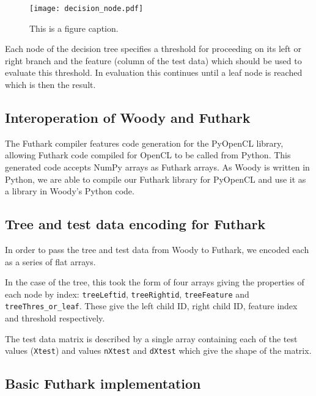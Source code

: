 \documentclass[a4paper]{article}
\begin{document}
\begin{figure}
\centering
\texttt{[image: decision\_node.pdf]}
\caption{\label{fig:frog1}This is a figure caption.}
\end{figure}

Each node of the decision tree specifies a threshold for proceeding on its left or right branch and the feature (column of the test data) which should be used to evaluate this threshold. In evaluation this continues until a leaf node is reached which is then the result. 

\subsection{Interoperation of Woody and Futhark}

The Futhark compiler features code generation for the PyOpenCL library, allowing Futhark code compiled for OpenCL to be called from Python. This generated code accepts NumPy arrays as Futhark arrays. As Woody is written in Python, we are able to compile our Futhark library for PyOpenCL and use it as a library in Woody's Python code.

\subsection{Tree and test data encoding for Futhark}

In order to pass the tree and test data from Woody to Futhark, we encoded each as a series of flat arrays.

In the case of the tree, this took the form of four arrays giving the properties of each node by index: \texttt{treeLeftid}, \texttt{treeRightid}, \texttt{treeFeature} and \texttt{treeThres\_or\_leaf}. These give the left child ID, right child ID, feature index and threshold respectively.

The test data matrix is described by a single array containing each of the test values (\texttt{Xtest}) and values \texttt{nXtest} and \texttt{dXtest} which give the shape of the matrix.

\subsection{Basic Futhark implementation}
\end{document}

